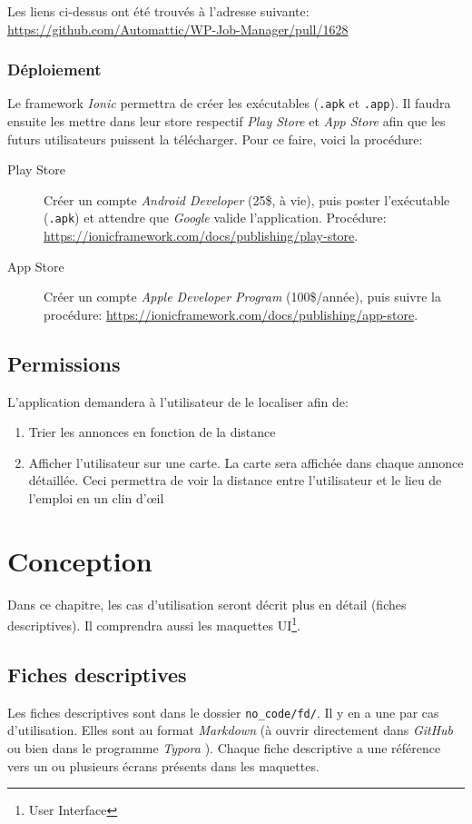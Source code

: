 \documentclass[french]{report}
\begin{document}
Les liens ci-dessus ont été trouvés à l'adresse suivante: \url{https://github.com/Automattic/WP-Job-Manager/pull/1628}

\subsection{Déploiement}

Le framework \textit{Ionic} permettra de créer les exécutables (\verb|.apk| et
\verb|.app|). Il faudra ensuite les mettre dans leur store respectif 
\textit{Play Store} et \textit{App Store} afin que les futurs utilisateurs puissent
la télécharger. Pour ce faire, voici la procédure:
\begin{description}
    \item[Play Store] Créer un compte \textit{Android Developer} (25\$, à vie), puis poster
    l'exécutable (\verb|.apk|) et attendre que \textit{Google} valide l'application.
    Procédure: \url{https://ionicframework.com/docs/publishing/play-store}.
    \item[App Store] Créer un compte \textit{Apple Developer Program} (100\$/année),
    puis suivre la procédure: \url{https://ionicframework.com/docs/publishing/app-store}.
\end{description}


\section{Permissions}
L'application demandera à l'utilisateur de le localiser afin de:
\begin{enumerate}
    \item Trier les annonces en fonction de la distance
    \item Afficher l'utilisateur sur une carte. La carte sera affichée dans chaque
    annonce détaillée. Ceci permettra de voir la distance entre l'utilisateur et le
    lieu de l'emploi en un clin d'\oe il
\end{enumerate}


\chapter{Conception}
Dans ce chapitre, les cas d'utilisation seront décrit plus en détail (fiches
descriptives). Il comprendra aussi les maquettes UI\footnote{User Interface}.

\section{Fiches descriptives}
Les fiches descriptives sont dans le dossier \verb|no_code/fd/|. Il y en a une par
cas d'utilisation. Elles sont au format \textit{Markdown} (à ouvrir directement dans
\textit{GitHub} ou bien dans le programme \textit{Typora }). Chaque fiche descriptive
a une référence vers un ou plusieurs écrans présents dans les maquettes.
\end{document}
